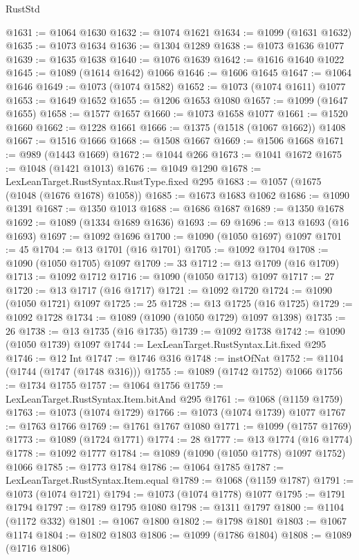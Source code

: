 \begin{lexlean}{RustStd}
\begin{coremodule}
@1631 := @1064 @1630
@1632 := @1074 @1621
@1634 := @1099 (@1631 @1632)
@1635 := @1073 @1634
@1636 := @1304 @1289
@1638 := @1073 @1636 @1077
@1639 := @1635 @1638
@1640 := @1076 @1639
@1642 := @1616 @1640 @1022
@1645 := @1089 (@1614 @1642) @1066
@1646 := @1606 @1645
@1647 := @1064 @1646
@1649 := @1073 (@1074 @1582)
@1652 := @1073 (@1074 @1611) @1077
@1653 := @1649 @1652
@1655 := @1206 @1653 @1080
@1657 := @1099 (@1647 @1655)
@1658 := @1577 @1657
@1660 := @1073 @1658 @1077
@1661 := @1520 @1660
@1662 := @1228 @1661
@1666 := @1375 (@1518 (@1067 @1662)) @1408
@1667 := @1516 @1666
@1668 := @1508 @1667
@1669 := @1506 @1668
@1671 := @989 (@1443 @1669)
@1672 := @1044 @266
@1673 := @1041 @1672
@1675 := @1048 (@1421 @1013)
@1676 := @1049 @1290
@1678 := LexLeanTarget.RustSyntax.RustType.fixed @295
@1683 := @1057 (@1675 (@1048 (@1676 @1678) @1058))
@1685 := @1673 @1683 @1062
@1686 := @1090 @1391
@1687 := @1350 @1013
@1688 := @1686 @1687
@1689 := @1350 @1678
@1692 := @1089 (@1334 @1689 @1636)
@1693 := 69
@1696 := @13 @1693 (@16 @1693)
@1697 := @1092 @1696
@1700 := @1090 (@1050 @1697) @1097
@1701 := 45
@1704 := @13 @1701 (@16 @1701)
@1705 := @1092 @1704
@1708 := @1090 (@1050 @1705) @1097
@1709 := 33
@1712 := @13 @1709 (@16 @1709)
@1713 := @1092 @1712
@1716 := @1090 (@1050 @1713) @1097
@1717 := 27
@1720 := @13 @1717 (@16 @1717)
@1721 := @1092 @1720
@1724 := @1090 (@1050 @1721) @1097
@1725 := 25
@1728 := @13 @1725 (@16 @1725)
@1729 := @1092 @1728
@1734 := @1089 (@1090 (@1050 @1729) @1097 @1398)
@1735 := 26
@1738 := @13 @1735 (@16 @1735)
@1739 := @1092 @1738
@1742 := @1090 (@1050 @1739) @1097
@1744 := LexLeanTarget.RustSyntax.Lit.fixed @295
@1746 := @12 Int
@1747 := @1746 @316
@1748 := instOfNat
@1752 := @1104 (@1744 (@1747 (@1748 @316)))
@1755 := @1089 (@1742 @1752) @1066
@1756 := @1734 @1755
@1757 := @1064 @1756
@1759 := LexLeanTarget.RustSyntax.Item.bitAnd @295
@1761 := @1068 (@1159 @1759)
@1763 := @1073 (@1074 @1729)
@1766 := @1073 (@1074 @1739) @1077
@1767 := @1763 @1766
@1769 := @1761 @1767 @1080
@1771 := @1099 (@1757 @1769)
@1773 := @1089 (@1724 @1771)
@1774 := 28
@1777 := @13 @1774 (@16 @1774)
@1778 := @1092 @1777
@1784 := @1089 (@1090 (@1050 @1778) @1097 @1752) @1066
@1785 := @1773 @1784
@1786 := @1064 @1785
@1787 := LexLeanTarget.RustSyntax.Item.equal
@1789 := @1068 (@1159 @1787)
@1791 := @1073 (@1074 @1721)
@1794 := @1073 (@1074 @1778) @1077
@1795 := @1791 @1794
@1797 := @1789 @1795 @1080
@1798 := @1311 @1797
@1800 := @1104 (@1172 @332)
@1801 := @1067 @1800
@1802 := @1798 @1801
@1803 := @1067 @1174
@1804 := @1802 @1803
@1806 := @1099 (@1786 @1804)
@1808 := @1089 (@1716 @1806)

\end{coremodule}
\end{lexlean}
